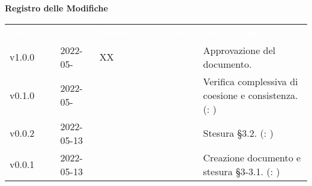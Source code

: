 

{\LARGE{\textbf{Registro delle Modifiche}}} \\
\begin{table}[!htbp]
\renewcommand{\arraystretch}{1.5}
\begin{tabular}{ m{}<{\centering}  m{}<{\centering}  m{}<{\centering}  m{}<{\centering}  m{}<{\centering} }
	\rowcolor{darkblue}
	\textcolor{white}{\textbf{Versione}} &\textcolor{white}{\textbf{Data}}& \textcolor{white}{\textbf{Nominativo}} & \textcolor{white}{\textbf{Ruolo}}&\textcolor{white}{\textbf{Descrizione}}\\ 

	v1.0.0 & 2022-05- & XX & \RE & Approvazione del documento. \\

	v0.1.0& 2022-05- & \FP & \AN & Verifica complessiva di coesione e consistenza.  (\VE: \textit{})\\
	
	v0.0.2& 2022-05-13 & \MB & \AN & Stesura \S{3.2}.  (\VE: \textit{})\\

	v0.0.1& 2022-05-13 & \GC & \AN & Creazione documento e stesura \S{3-3.1}.  (\VE: \textit{})\\
	
	
\end{tabular}
\end{table}

\pagebreak